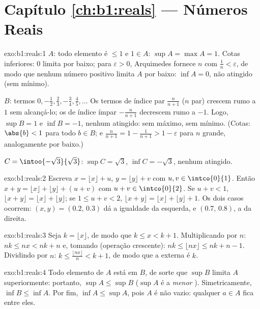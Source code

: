 \section*{Capítulo \ref{ch:b1:reals} --- Números Reais}

\begin{solution}{exo:b1:reals:1}
$A$: todo elemento é $\leq 1$ e $1 \in A$: $\sup A = \max A = 1$.
Cotas inferiores: $0$ limita por baixo; para $\varepsilon > 0$, Arquimedes
fornece $n$ com $\frac 1n < \varepsilon$, de modo que nenhum número positivo
limita $A$ por baixo: $\inf A = 0$, não atingido (sem mínimo).

$B$: termos $0, -\frac12, \frac23, -\frac34, \frac45, \dots$ Os termos de
índice par $\frac{n}{n+1}$ ($n$ par) crescem rumo a $1$ sem alcançá-lo;
os de índice ímpar $-\frac{n}{n+1}$ decrescem rumo a $-1$. Logo, $\sup B = 1$ e
$\inf B = -1$, nenhum atingido: sem máximo, sem mínimo. (Cotas: $\abs{b}
< 1$ para todo $b \in B$; e $\frac{n}{n+1} = 1 - \frac{1}{n+1} > 1 -
\varepsilon$ para $n$ grande, analogamente por baixo.)

$C = \intoo{-\sqrt 3}{\sqrt 3}$: $\sup C = \sqrt 3$, $\inf C =
-\sqrt 3$, nenhum atingido.
\end{solution}

\begin{solution}{exo:b1:reals:2}
Escreva $x = \lfloor x \rfloor + u$, $y = \lfloor y \rfloor + v$ com
$u, v \in \intco{0}{1}$. Então $x + y = \lfloor x \rfloor + \lfloor y
\rfloor + (u + v)$ com $u + v \in \intco{0}{2}$. Se $u + v < 1$,
$\lfloor x + y\rfloor = \lfloor x\rfloor + \lfloor y \rfloor$; se
$1 \leq u + v < 2$, $\lfloor x+y \rfloor = \lfloor x \rfloor +
\lfloor y \rfloor + 1$. Os dois casos ocorrem: $(x, y) = (0.2,\, 0.3)$
dá a igualdade da esquerda, e $(0.7,\, 0.8)$, a da direita.
\end{solution}

\begin{solution}{exo:b1:reals:3}
Seja $k = \lfloor x \rfloor$, de modo que $k \leq x < k + 1$. Multiplicando por
$n$: $nk \leq nx < nk + n$ e, tomando  (operação crescente):
$nk \leq \lfloor nx \rfloor \leq nk + n
- 1$. Dividindo por $n$: $k \leq \frac{\lfloor nx \rfloor}{n} < k + 1$,
de modo que a  externa é $k$.
\end{solution}

\begin{solution}{exo:b1:reals:4}
Todo elemento de $A$ está em $B$, de sorte que $\sup B$ limita $A$
superiormente: portanto, $\sup A \leq \sup B$ ($\sup A$ é a \emph{menor} ). Simetricamente, $\inf B \leq \inf A$. Por fim, $\inf A \leq
\sup A$, pois $A$ é não vazio: qualquer $a \in A$ fica entre eles.
\end{solution}

